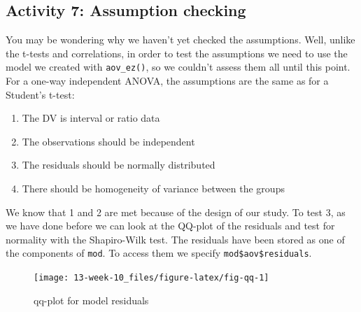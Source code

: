 \documentclass[]{book}
\newenvironment{Shaded}{\begin{snugshade}}{\end{snugshade}}
\newcommand{\KeywordTok}[1]{\textcolor[rgb]{0.13,0.29,0.53}{\textbf{#1}}}
\newcommand{\NormalTok}[1]{#1}
\newcommand{\OperatorTok}[1]{\textcolor[rgb]{0.81,0.36,0.00}{\textbf{#1}}}
\providecommand{\tightlist}{%
  \setlength{\itemsep}{0pt}\setlength{\parskip}{0pt}}
\begin{document}
\hypertarget{activity-7-assumption-checking}{%
\subsection{Activity 7: Assumption checking}\label{activity-7-assumption-checking}}

You may be wondering why we haven't yet checked the assumptions. Well, unlike the t-tests and correlations, in order to test the assumptions we need to use the model we created with \texttt{aov\_ez()}, so we couldn't assess them all until this point. For a one-way independent ANOVA, the assumptions are the same as for a Student's t-test:

\begin{enumerate}
\def\labelenumi{\arabic{enumi}.}
\tightlist
\item
  The DV is interval or ratio data
\item
  The observations should be independent
\item
  The residuals should be normally distributed
\item
  There should be homogeneity of variance between the groups
\end{enumerate}

We know that 1 and 2 are met because of the design of our study. To test 3, as we have done before we can look at the QQ-plot of the residuals and test for normality with the Shapiro-Wilk test. The residuals have been stored as one of the components of \texttt{mod}. To access them we specify \texttt{mod\$aov\$residuals}.

\begin{Shaded}
\end{Shaded}

\begin{figure}

{\centering \texttt{[image: 13-week-10\_files/figure-latex/fig-qq-1]} 

}

\caption{qq-plot for model residuals}\label{fig:fig-qq}
\end{figure}

\begin{Shaded}
\end{Shaded}
\end{document}
